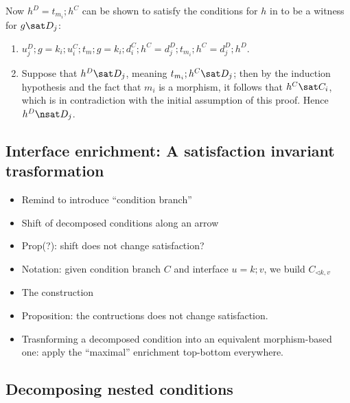 Now $h^D=t_{m_i};h^C$ can be shown to satisfy the conditions for $h$ in  to be a witness for $g\sat D_j$:
\begin{enumerate}
\item $u_j^D;g = k_i;u_i^C;t_m;g= k_i;d_i^C;h^C = d_j^D;t_{m_i};h^C=d_j^D;h^D$.
\item Suppose that $h^D\sat D_j$, meaning $t_{m_i};h^C\sat D_j$; then by the induction hypothesis and the fact that $m_i$ is a morphism, it follows that $h^C\sat C_i$, which is in contradiction with the initial assumption of this proof. Hence $h^D\nsat D_j$.
\end{enumerate}
%
\subsection{Interface enrichment: A satisfaction invariant trasformation}

\begin{itemize}
  \item Remind to introduce ``condition branch''
  \item Shift of decomposed conditions along an arrow
  \item Prop(?): shift does not change satisfaction?
  \item Notation: given condition branch $C$ and interface $u = k;v$, we build $C_{\triangleleft k, v}$
  \item The construction
  \item Proposition: the contructions does not change satisfaction.
  \item Trasnforming a decomposed condition into an equivalent morphism-based one: apply the ``maximal'' enrichment top-bottom everywhere.
\end{itemize}  


\subsection{Decomposing nested conditions}

